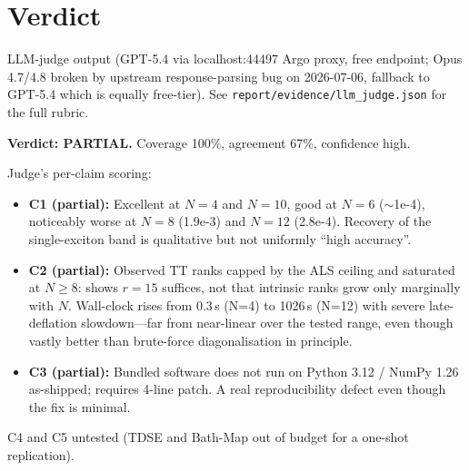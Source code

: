 \documentclass[11pt]{article}
\begin{document}
\section{Verdict}
LLM-judge output (GPT-5.4 via localhost:44497 Argo proxy, free endpoint; Opus
4.7/4.8 broken by upstream response-parsing bug on 2026-07-06, fallback to
GPT-5.4 which is equally free-tier). See \texttt{report/evidence/llm\_judge.json}
for the full rubric.

\textbf{Verdict: PARTIAL.}  Coverage 100\%, agreement 67\%, confidence high.

Judge's per-claim scoring:
\begin{itemize}
\item \textbf{C1 (partial):} Excellent at $N{=}4$ and $N{=}10$, good at $N{=}6$
      ($\sim$1e-4), noticeably worse at $N{=}8$ (1.9e-3) and $N{=}12$ (2.8e-4).
      Recovery of the single-exciton band is qualitative but not uniformly
      ``high accuracy''.
\item \textbf{C2 (partial):} Observed TT ranks capped by the ALS ceiling and
      saturated at $N \ge 8$: shows $r{=}15$ suffices, not that intrinsic
      ranks grow only marginally with $N$. Wall-clock rises from 0.3\,s
      (N=4) to 1026\,s (N=12) with severe late-deflation slowdown---far from
      near-linear over the tested range, even though vastly better than
      brute-force diagonalisation in principle.
\item \textbf{C3 (partial):} Bundled software does not run on Python 3.12 /
      NumPy 1.26 as-shipped; requires 4-line patch. A real reproducibility
      defect even though the fix is minimal.
\end{itemize}

C4 and C5 untested (TDSE and Bath-Map out of budget for a one-shot
replication).
\end{document}
